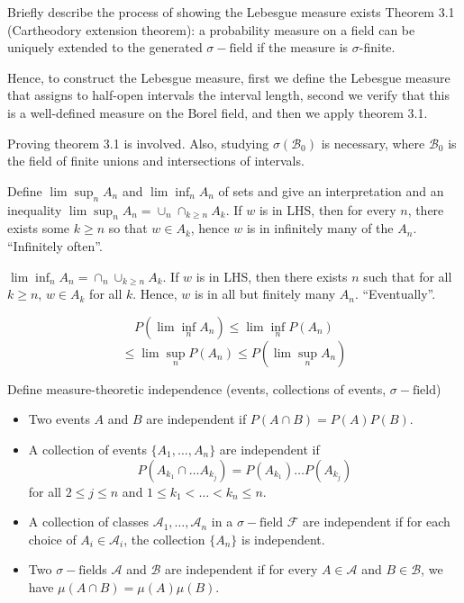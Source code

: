 \documentclass[avery5388,grid,frame]{flashcards}
\newcommand{\sigf}{\sigma-\text{field}}
\newcommand{\F}{\mathcal F}
\begin{document}
\begin{flashcard}
    {Briefly describe the process of showing the Lebesgue measure exists}
    Theorem 3.1 (Cartheodory extension theorem): a probability measure on a field can be uniquely extended to the generated $\sigf$ if the measure is $\sigma$-finite.

    Hence, to construct the Lebesgue measure, first we define the Lebesgue measure that assigns to half-open intervals the interval length, second we verify that this is a well-defined measure on the Borel field, and then we apply theorem 3.1.

    Proving theorem 3.1 is involved. Also, studying $\sigma(\mathcal B_0)$ is necessary, where $\mathcal B_0$ is the field of finite unions and intersections of intervals.
\end{flashcard}


\begin{flashcard}
    {Define $\lim \sup_n A_n$ and $\lim \inf_n A_n$ of sets and give an interpretation and an inequality}
    $\lim \sup_n A_n = \cup_n \cap_{k \geq n} A_k$. If $w$ is in LHS, then for every $n$, there exists some $k \geq n$ so that $w \in A_k$, hence $w$ is in infinitely many of the $A_n$. ``Infinitely often''.

    $\lim \inf_n A_n = \cap_n \cup_{k \geq n} A_k$. If $w$ is in LHS, then there exists $n$ such that for all $k \geq n$, $w \in A_k$ for all $k$. Hence, $w$ is in all but finitely many $A_n$. ``Eventually''.

    $$P(\lim \inf_n A_n) \leq \lim \inf_n P(A_n)$$
    $$\leq \lim \sup_n P(A_n) \leq P(\lim \sup_n A_n)$$
\end{flashcard}


\begin{flashcard}
    {Define measure-theoretic independence (events, collections of events, $\sigf$)}
    \begin{itemize}
        \item Two events $A$ and $B$ are independent if $P(A \cap B) = P(A) P(B)$.
        \item A collection of events $\{ A_1, \dots, A_n \}$ are independent if
        $$P(A_{k_1} \cap \dots A_{k_j}) = P(A_{k_1}) \dots P(A_{k_j})$$
        for all $2 \leq j \leq n$ and $1 \leq k_1 < \dots < k_n \leq n$.
        \item A collection of classes $\mathcal A_1, \dots, \mathcal A_n$ in a $\sigf$ $\F$ are independent if for each choice of $A_i \in \mathcal A_i$, the collection $\{ A_n \}$ is independent.
        \item Two $\sigf$s $\mathcal A$ and $\mathcal B$ are independent if for every $A \in \mathcal A$ and $B \in \mathcal B$, we have $\mu(A \cap B) = \mu(A) \mu(B)$.
    \end{itemize}
\end{flashcard}
\end{document}
